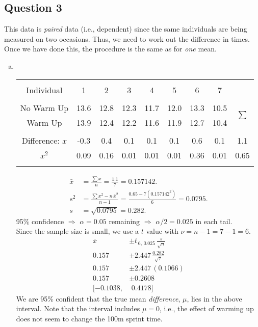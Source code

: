 \documentclass[12pt]{article}
\begin{document}
{\begin{minipage}[t]{0.98\textwidth}
\subsection*{Question 3}
This data is \emph{paired} data (i.e., dependent) since the same individuals are being measured on two occasions. Thus, we need to work out the difference in times. Once we have done this, the procedure is the same as for \emph{one} mean.
\begin{enumerate}[a)]
\item \quad \\[-1.45cm]
\begin{center}
\begin{tabular}{|c|ccccccc|c|}
\hline
&&&&&&&&\\[-0.4cm]
Individual & 1 & 2 & 3 & 4 & 5 & 6 & 7 &  \\[0.1cm]
\cline{1-8}
&&&&&&&&\\[-0.4cm]
No Warm Up & 13.6 & 12.8 & 12.3 & 11.7 & 12.0 & 13.3 & 10.5 &  \multirow{2}{*}{$\sum$} \\[0.1cm]
Warm Up    & 13.9 & 12.4 & 12.2 & 11.6 & 11.9 & 12.7 & 10.4 & \\[0.1cm]
\hline
&&&&&&&&\\[-0.4cm]
Difference: $x$    & -0.3 & 0.4 & 0.1 & 0.1 & 0.1 & 0.6 & 0.1 & 1.1 \\[0.1cm]
\phantom{Difference:\,} $x^2$    & 0.09 & 0.16 & 0.01 & 0.01 & 0.01 & 0.36 & 0.01 & 0.65\\[0.1cm]
\hline
\multicolumn{9}{c}{}\\[-0.8cm]
\end{tabular}
\end{center}
\begin{align*}
\bar x &= \frac{\sum x}{n} = \frac{1.1}{7} = 0.157142. \\[0.6cm]
s^2 &= \frac{\sum x^2 - n \, \bar x^2 }{n-1} = \frac{0.65 - 7(0.157142^2)}{6} =  0.0795. \\[0.6cm]
s &= \sqrt{0.0795} = 0.282.
\end{align*}
95\% confidence $\Rightarrow$ $\alpha=0.05$ remaining $\Rightarrow$ $\alpha/2=0.025$ in each tail.\\[0.3cm]
Since the sample size is small, we use a $t$ value with $\nu  = n - 1 = 7-1 =6$.
\begin{align*}
\bar x &\pm t_{\,6,\,0.025} \, \frac{s}{\sqrt{n}} \\[0.2cm]
0.157 &\pm 2.447 \, \frac{0.282}{\sqrt{7}} \\[0.2cm]
0.157 &\pm 2.447 \, (0.1066) \\[0.2cm]
0.157 &\pm 0.2608 \\[0.2cm]
[-0.1038,&\,\,0.4178]
\end{align*}
We are 95\% confident that the true mean \emph{difference}, $\mu$, lies in the above interval. Note that the interval includes $\mu = 0$, i.e., the effect of warming up does not seem to change the 100m sprint time.
\end{enumerate}
\end{minipage}}\vspace{0.03\textwidth}
\end{document}
